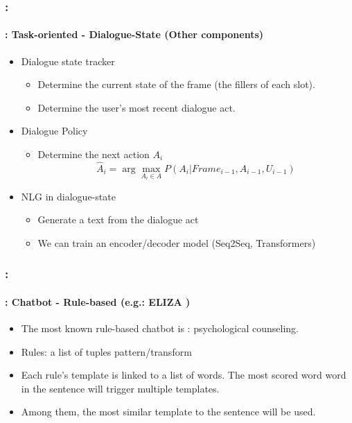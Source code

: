 \documentclass[xcolor=table]{beamer}
\begin{document}
\begin{frame}
	\frametitle{\insertshortsubtitle: \insertsection}
	\framesubtitle{\insertsubsection: Task-oriented - Dialogue-State (Other components)}
	
	\begin{itemize}
		\item Dialogue state tracker
		\begin{itemize}
			\item Determine the current state of the frame (the fillers of each slot).
			\item Determine the user's most recent dialogue act.
		\end{itemize}
	
		\item Dialogue Policy
		\begin{itemize}
			\item Determine the next action $A_i$ 
			\[\hat{A}_i = \arg\max_{A_i \in A} P(A_i | Frame_{i-1}, A_{i-1}, U_{i-1})\]
		\end{itemize}
	
		\item NLG in dialogue-state 
		\begin{itemize}
			\item Generate a text from the dialogue act
			\item We can train an encoder/decoder model (Seq2Seq, Transformers)
		\end{itemize}
	\end{itemize}
	
\end{frame}

\begin{frame}
	\frametitle{\insertshortsubtitle: \insertsection}
	\framesubtitle{\insertsubsection: Chatbot - Rule-based (e.g.: ELIZA \cite{1966-Weizenbaum})}
	
	\begin{itemize}
		\item The most known rule-based chatbot is : psychological counseling.
		\item Rules: a list of tuples pattern/transform 
		
		
		
		\item Each rule's template is linked to a list of words. 
		The most scored word word in the sentence will trigger multiple templates.
		
		\item Among them, the most similar template to the sentence will be used.
	\end{itemize}
	
\end{frame}
\end{document}
